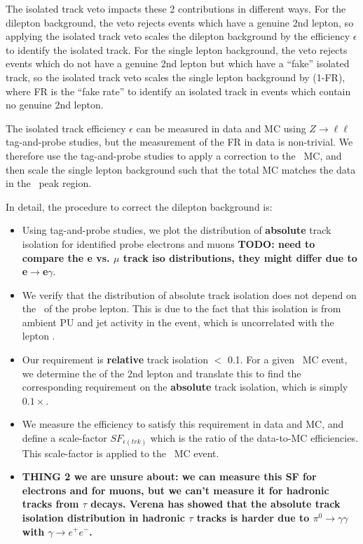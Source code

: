 The isolated track veto impacts these 2 contributions in different ways. For the dilepton background, the veto
rejects events which have a genuine 2nd lepton, so applying the isolated track veto scales the dilepton background
by the efficiency $\epsilon$ to identify the isolated track. For the single lepton background, the veto rejects events
which do not have a genuine 2nd lepton but which have a ``fake'' isolated track, so the isolated track veto scales
the single lepton background by (1-FR), where FR is the ``fake rate'' to identify an isolated track in events which
contain no genuine 2nd lepton. 

The isolated track efficiency $\epsilon$ can be measured in data and MC using $Z\to\ell\ell$ tag-and-probe studies,
but the measurement of the FR in data is non-trivial. We therefore use the tag-and-probe studies to apply a correction
to the \ttll\ MC, and then scale the single lepton background such that the total MC matches the data in the \mt\ peak region.

In detail, the procedure to correct the dilepton background is:

\begin{itemize}
\item Using tag-and-probe studies, we plot the distribution of {\bf absolute} track isolation for identified probe electrons
and muons {\bf TODO: need to compare the e vs. $\mu$ track iso distributions, they might differ due to e$\to$e$\gamma$}.
\item We verify that the distribution of absolute track isolation does not depend on the \pt\ of the probe lepton.
This is due to the fact that this isolation is from ambient PU and jet activity in the event, which is uncorrelated with
the lepton .
\item Our requirement is {\bf relative} track isolation $<$ 0.1. For a given \ttll\ MC event, we determine the \pt of the 2nd
lepton and translate this to find the corresponding requirement on the {\bf absolute} track isolation, which is simply $0.1\times$\pt.
\item We measure the efficiency to satisfy this requirement in data and MC, and define a scale-factor $SF_{\epsilon(trk)}$ which
is the ratio of the data-to-MC efficiencies. This scale-factor is applied to the \ttll\ MC event.
\item {\bf THING 2 we are unsure about: we can measure this SF for electrons and for muons, but we can't measure it for hadronic tracks from $\tau$ decays. Verena has showed that the absolute track isolation distribution in hadronic $\tau$ tracks is harder due to $\pi^0\to\gamma\gamma$ with $\gamma\to e^+e^-$.}
\end{itemize} 

